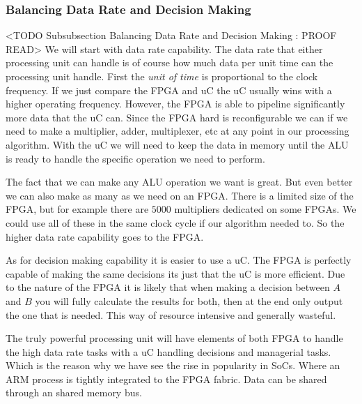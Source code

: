 \subsubsection{Balancing Data Rate and Decision Making}
	<TODO Subsubsection  Balancing Data Rate and Decision Making : PROOF READ>
We will start with data rate capability. The data rate that either processing unit can handle is of course how much data per unit time can the processing unit handle. First the \emph{unit of time} is proportional to the clock frequency. If we just compare the \ac{FPGA} and \ac{uC} the \ac{uC} usually wins with a higher operating frequency. However, the \ac{FPGA} is able to pipeline significantly more data that the \ac{uC} can. Since the \ac{FPGA} hard is reconfigurable we can if we need to make a multiplier, adder, multiplexer, etc at any point in our processing algorithm. With the \ac{uC} we will need to keep the data in memory until the \ac{ALU} is ready to handle the specific operation we need to perform.

The fact that we can make any \ac{ALU} operation we want is great. But even better we can also make as many as we need on an \ac{FPGA}. There is a limited size of the \ac{FPGA}, but for example there are $5000$ multipliers dedicated on some \ac{FPGA}s. We could use all of these in the same clock cycle if our algorithm needed to. So the higher data rate capability goes to the \ac{FPGA}.

As for decision making capability it is easier to use a \ac{uC}. The \ac{FPGA} is perfectly capable of making the same decisions its just that the \ac{uC} is more efficient. Due to the nature of the \ac{FPGA} it is likely that when making a decision between $A$ and $B$ you will fully calculate the results for both, then at the end only output the one that is needed. This way of resource intensive and generally wasteful.

The truly powerful processing unit will have elements of both \ac{FPGA} to handle the high data rate tasks with a \ac{uC} handling decisions and managerial tasks. Which is the reason why we have see the rise in popularity in \ac{SoC}s. Where an \ac{ARM} process is tightly integrated to the \ac{FPGA} fabric. Data can be shared through an shared memory bus.

